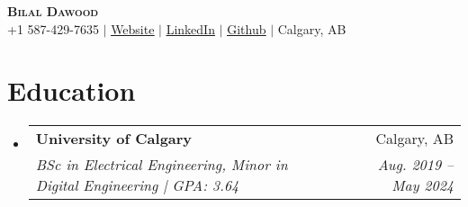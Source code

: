 \documentclass[A4,10pt]{article}
\makeatletter
\newcommand{\resumeSubheading}[4]{
  \vspace{-2pt}\item
    \begin{tabular*}{0.97\textwidth}[t]{l@{\extracolsep{\fill}}r}
      \textbf{#1} & #2 \\
      \textit{\small#3} & \textit{\small #4} \\
    \end{tabular*}\vspace{-7pt}
}
\newcommand{\resumeSubHeadingListStart}{\begin{itemize}[leftmargin=0.15in, label={}]}
\newcommand{\resumeSubHeadingListEnd}{\end{itemize}}
\makeatother
\begin{document}

\begin{center}
    \textbf{\Huge \scshape Bilal Dawood} \\ \vspace{1pt}
    \small +1 587-429-7635 $|$ \href{https://bilaldawood01.github.io}{\underline{Website}} $|$ 
    \href{https://linkedin.com/in/bilal-dawood-2021}{\underline{LinkedIn}} $|$
    \href{https://github.com/BilalDawood01}{\underline{Github}} $|$
\small{Calgary, AB}
\end{center}


\section{Education}
  \resumeSubHeadingListStart
    \resumeSubheading
      {University of Calgary}{Calgary, AB}
      {BSc in Electrical Engineering, Minor in Digital Engineering | GPA: 3.64}{Aug. 2019 -- May 2024}

  \resumeSubHeadingListEnd

\end{document}
